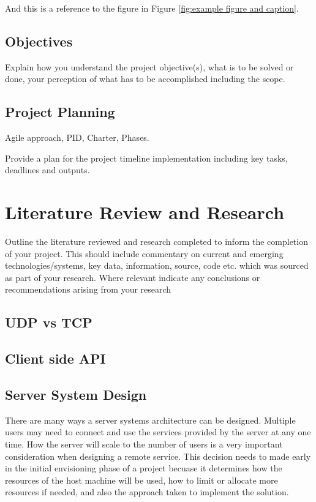 \documentclass[12pt,a4paper,titlepage]{article}
\begin{document}
And this is a reference to the figure in Figure \ref{fig:example figure and caption}.

\subsection{Objectives}
Explain how you understand the project objective(s), what is to be solved or done, your perception of what has to be accomplished including the scope. 

\subsection{Project Planning}
Agile approach, PID, Charter, Phases.

Provide a plan for the project timeline implementation including key tasks, deadlines and outputs.

\section{Literature Review and Research}
Outline the literature reviewed and research completed to inform the completion of your project.  This should include commentary on current and emerging technologies/systems, key data, information, source, code etc. which was sourced as part of your research.  Where relevant indicate any conclusions or recommendations arising from your research

\subsection{UDP vs TCP}


\subsection{Client side API}



\subsection{Server System Design}

There are many ways a server systems architecture can be designed. Multiple users may need to connect and use the services provided by the server at any one time. How the server will scale to the number of users is a very important consideration when designing a remote service. This decision needs to made early in the initial envisioning phase of a project becuase it determines how the resources of the host machine will be used, how to limit or allocate more resources if needed, and also the approach taken to implement the solution. 
\end{document}
